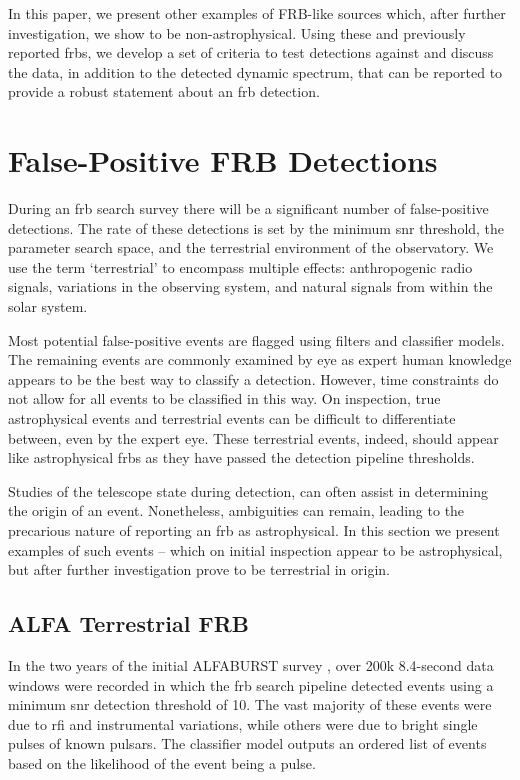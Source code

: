 \documentclass[a4paper,fleqn,usenatbib]{mnras}
\begin{document}
In this paper, we present other examples of FRB-like sources which, after
further investigation, we show to be non-astrophysical. Using these and
previously reported \glspl{frb}, we develop a set of criteria to test detections
against and discuss the data, in addition to the detected dynamic spectrum, that
can be reported to provide a robust statement about an \gls{frb} detection.

\section{False-Positive FRB Detections}
\label{sec:false-pos}

During an \gls{frb} search survey there will be a significant number of
false-positive detections. The rate of these detections is set by the minimum
\gls{snr} threshold, the parameter search space, and the terrestrial environment
of the observatory. We use the term `terrestrial' to encompass multiple effects:
anthropogenic radio signals, variations in the observing system, and natural
signals from within the solar system.

Most potential false-positive events are flagged using filters and classifier
models.  The remaining events are commonly examined by eye as expert human
knowledge appears to be the best way to classify a detection. However, time
constraints do not allow for all events to be classified in this way. On
inspection, true astrophysical events and terrestrial events can be difficult to
differentiate between, even by the expert eye.  These terrestrial events, indeed,
should appear like astrophysical \glspl{frb} as they have passed the detection
pipeline thresholds. 

Studies of the telescope state during detection, can often assist in determining
the origin of an event. Nonetheless, ambiguities can remain, leading to the
precarious nature of reporting an \gls{frb} as astrophysical.  In this section we
present examples of such events -- which on initial inspection appear to be
astrophysical, but after further investigation prove to be terrestrial in
origin.

\subsection{ALFA Terrestrial FRB}
\label{sec:D20161204}

In the two years of the initial ALFABURST survey \citep{2017ApJS..228...21C,
2018MNRAS.474.3847F}, over 200k 8.4-second data windows were recorded in which
the \gls{frb} search pipeline detected events using a minimum \gls{snr}
detection threshold of 10. The vast majority of these events were due to
\gls{rfi} and instrumental variations, while others were due to bright single
pulses of known pulsars.  The classifier model outputs an ordered list of events
based on the likelihood of the event being a pulse.
\end{document}
